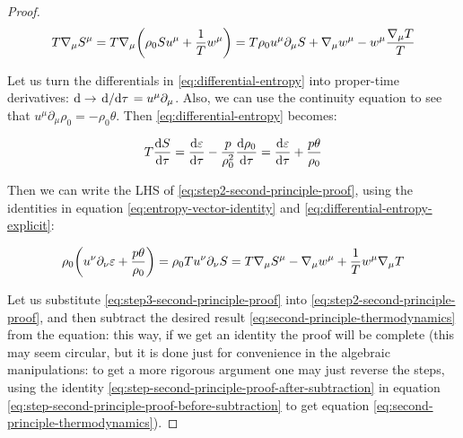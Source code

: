 \documentclass[main.tex]{subfiles}
\begin{document}
\begin{proof}
    \begin{equation} \label{eq:entropy-vector-identity}
        T \nabla_\mu S^\mu
        = T \nabla_\mu \qty(\rho_0 S u^\mu + \frac 1T w^\mu )
        = T \rho_0 u^\mu \partial_\mu S + \nabla_\mu w^\mu - w^\mu \frac{\nabla_\mu T}{T}
    \end{equation}

    Let us turn the differentials in \eqref{eq:differential-entropy} into proper-time derivatives: \(\dd \rightarrow \dv*{}{\tau} = u^\mu \partial_\mu \). Also, we can use the continuity equation to see that \(u^\mu \partial_\mu \rho_0 = - \rho_0 \theta\).
    Then \eqref{eq:differential-entropy} becomes:

    \begin{equation} \label{eq:differential-entropy-explicit}
        T \dv{S}{\tau}  = \dv{\varepsilon}{\tau} - \frac{p}{\rho_0^2} \dv{\rho_0}{\tau}  =\dv{\varepsilon}{\tau} + \frac{p \theta}{\rho_0}
    \end{equation}

    Then we can write the LHS of \eqref{eq:step2-second-principle-proof}, using the identities in
    equation \eqref{eq:entropy-vector-identity} and \eqref{eq:differential-entropy-explicit}:

    \begin{equation} \label{eq:step3-second-principle-proof}
        \rho_0 \qty(u^\nu \partial_\nu \varepsilon + \frac{p \theta}{\rho_0})
        = \rho_0 T u^\nu \partial_\nu S
        = T\nabla_\mu S^\mu - \nabla_\mu w^\mu + \frac{1}{T} w^\mu \nabla_\mu T
    \end{equation}

    Let us substitute \eqref{eq:step3-second-principle-proof} into \eqref{eq:step2-second-principle-proof},
    and then subtract the desired result \eqref{eq:second-principle-thermodynamics}  from the equation: this way, if we get an identity the proof will be complete (this may seem circular, but it is done just for convenience in the algebraic manipulations: to get a more rigorous argument one may just reverse the steps, using the identity \eqref{eq:step-second-principle-proof-after-subtraction} in equation \eqref{eq:step-second-principle-proof-before-subtraction} to get equation \eqref{eq:second-principle-thermodynamics}).


\end{proof}
\end{document}
